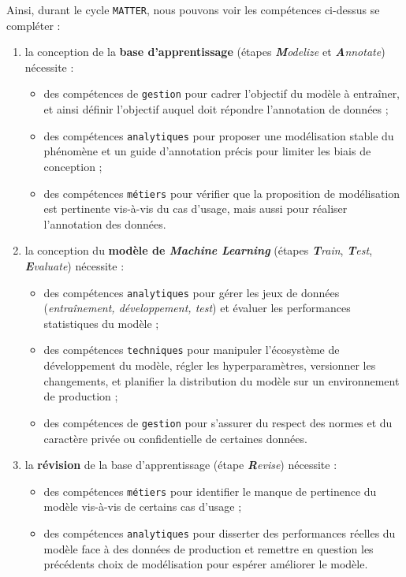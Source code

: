 		Ainsi, durant le cycle \texttt{MATTER}, nous pouvons voir les compétences ci-dessus se compléter :
		\begin{enumerate}
			\item la conception de la \textbf{base d'apprentissage} (étapes \textit{\textbf{M}odelize} et \textit{\textbf{A}nnotate}) nécessite :
			\begin{itemize}
				\item des compétences de \texttt{gestion} pour cadrer l'objectif du modèle à entraîner, et ainsi définir l'objectif auquel doit répondre l'annotation de données ;
				\item des compétences \texttt{analytiques} pour proposer une modélisation stable du phénomène et un guide d'annotation précis pour limiter les biais de conception ;
				\item des compétences \texttt{métiers} pour vérifier que la proposition de modélisation est pertinente vis-à-vis du cas d'usage, mais aussi pour réaliser l'annotation des données.
			\end{itemize}
			\item la conception du \textbf{modèle de \textit{Machine Learning}} (étapes \textit{\textbf{T}rain}, \textit{\textbf{T}est}, \textit{\textbf{E}valuate}) nécessite :
			\begin{itemize}
				\item des compétences \texttt{analytiques} pour gérer les jeux de données (\textit{entraînement, développement, test}) et évaluer les performances statistiques du modèle ;
				\item des compétences \texttt{techniques} pour manipuler l'écosystème de développement du modèle, régler les hyperparamètres, versionner les changements, et planifier la distribution du modèle sur un environnement de production ;
				\item des compétences de \texttt{gestion} pour s'assurer du respect des normes et du caractère privée ou confidentielle de certaines données.
			\end{itemize}
			\item la \textbf{révision} de la base d'apprentissage (étape \textit{\textbf{R}evise}) nécessite :
			\begin{itemize}
				\item des compétences \texttt{métiers} pour identifier le manque de pertinence du modèle vis-à-vis de certains cas d'usage ;
				\item des compétences \texttt{analytiques} pour disserter des performances réelles du modèle face à des données de production et remettre en question les précédents choix de modélisation pour espérer améliorer le modèle.
			\end{itemize}
		\end{enumerate}
		
